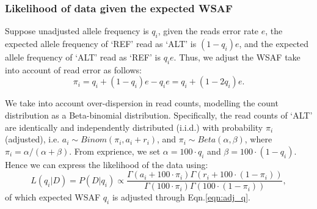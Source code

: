 \documentclass{bioinfo}
\begin{document}
\begin{methods}
\subsubsection{Likelihood of data given the expected WSAF}
Suppose unadjusted allele frequency is $q_i$, given the reads error rate $e$, the expected allele frequency of `REF' read as `ALT' is $(1 - q_i)e$, and the expected allele frequency of `ALT' read as `REF' is $q_ie$. Thus, we adjust the WSAF take into account of read error as follows:
\begin{equation}
\pi_i = q_i + (1 - q_i)e - q_ie = q_i + (1 - 2q_i)e.\label{eqn:adj_q}
\end{equation}

We take into account over-dispersion in read counts, modelling the count distribution as a Beta-binomial distribution. Specifically, the read counts of `ALT' are identically and independently distributed (i.i.d.) with probability $\pi_{i}$ (adjusted), i.e. $a_i \sim Binom(\pi_{i}, a_i + r_i)$, and $\pi_{i}\sim Beta(\alpha, \beta)$, where $\pi_{i} = \alpha/(\alpha+\beta)$. From exprience, we set $\alpha = 100\cdot q_{i} $ and $\beta = 100\cdot (1-q_{i})$. Hence we can express the likelihood of the data using:
\begin{equation}
L(q_{i} | D) = P(D|q_{i}) \propto \frac{\Gamma(a_i + 100\cdot \pi_{i}) \Gamma(r_i + 100\cdot (1-\pi_{i}))}{\Gamma(100\cdot \pi_{i})\Gamma(100\cdot (1-\pi_{i}))}, \label{eqn:llk}
\end{equation}
of which expected WSAF $q_i$ is adjusted through Eqn.\eqref{eqn:adj_q}.



\end{methods}
\end{document}

